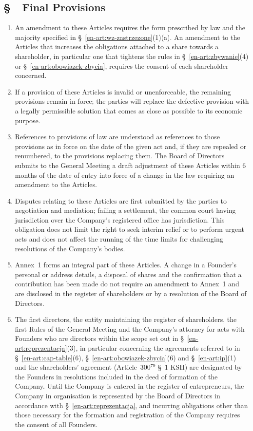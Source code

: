 \documentclass[12pt,a4paper]{report}
\newcounter{paragraf}
\newcommand{\paragraf}[1]{%
  \refstepcounter{paragraf}%
  \phantomsection%
  \addcontentsline{toc}{section}{\S~\theparagraf\ #1}%
  \Needspace{6\baselineskip}%
  \subsection*{\S~\theparagraf\ #1}%
}
\newenvironment{ContractClause}[1]{%
  \paragraf{#1}%
}{%
  \par
}
\begin{document}
\begin{ContractClause}{Final Provisions}
\label{en-art:final}
\begin{enumerate}
  \item An amendment to these Articles requires the form prescribed by law and the majority specified in \S~\ref{en-art:wz-zastrzezone}(1)(a). An amendment to the Articles that increases the obligations attached to a share towards a shareholder, in particular one that tightens the rules in \S~\ref{en-art:zbywanie}(4) or \S~\ref{en-art:obowiazek-zbycia}, requires the consent of each shareholder concerned.
  \item If a provision of these Articles is invalid or unenforceable, the remaining provisions remain in force; the parties will replace the defective provision with a legally permissible solution that comes as close as possible to its economic purpose.
  \item References to provisions of law are understood as references to those provisions as in force on the date of the given act and, if they are repealed or renumbered, to the provisions replacing them. The Board of Directors submits to the General Meeting a draft adjustment of these Articles within 6 months of the date of entry into force of a change in the law requiring an amendment to the Articles.
  \item Disputes relating to these Articles are first submitted by the parties to negotiation and mediation; failing a settlement, the common court having jurisdiction over the Company's registered office has jurisdiction. This obligation does not limit the right to seek interim relief or to perform urgent acts and does not affect the running of the time limits for challenging resolutions of the Company's bodies.
  \item Annex~1 forms an integral part of these Articles. A change in a Founder's personal or address details, a disposal of shares and the confirmation that a contribution has been made do not require an amendment to Annex~1 and are disclosed in the register of shareholders or by a resolution of the Board of Directors.
  \item The first directors, the entity maintaining the register of shareholders, the first Rules of the General Meeting and the Company's attorney for acts with Founders who are directors within the scope set out in \S~\ref{en-art:reprezentacja}(3), in particular concerning the agreements referred to in \S~\ref{en-art:cap-table}(6), \S~\ref{en-art:obowiazek-zbycia}(6) and \S~\ref{en-art:ip}(1) and the shareholders' agreement (Article~300$^{79}$ \S~1 KSH) are designated by the Founders in resolutions included in the deed of formation of the Company. Until the Company is entered in the register of entrepreneurs, the Company in organisation is represented by the Board of Directors in accordance with \S~\ref{en-art:reprezentacja}, and incurring obligations other than those necessary for the formation and registration of the Company requires the consent of all Founders.
\end{enumerate}
\end{ContractClause}
\end{document}

